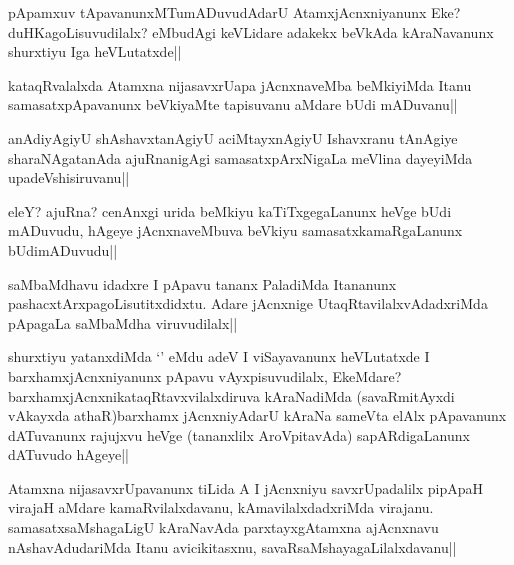 
\begin{artha}
pApamxuv tApavanunxMTumADuvudAdarU AtamxjAcnxniyanunx Eke? duHKagoLisuvudilalx? eMbudAgi keVLidare adakekx beVkAda kAraNavanunx shurxtiyu Iga heVLutatxde||
\end{artha}

\begin{artha}
kataqRvalalxda Atamxna nijasavxrUapa jAcnxnaveMba beMkiyiMda Itanu samasatxpApavanunx beVkiyaMte tapisuvanu aMdare bUdi mADuvanu||
\end{artha}

\begin{artha}
anAdiyAgiyU shAshavxtanAgiyU aciMtayxnAgiyU Ishavxranu tAnAgiye sharaNAgatanAda ajuRnanigAgi samasatxpArxNigaLa meVlina dayeyiMda upadeVshisiruvanu||
\end{artha}


\begin{artha}
eleY? ajuRna? cenAnxgi urida beMkiyu kaTiTxgegaLanunx heVge bUdi mADuvudu, hAgeye jAcnxnaveMbuva beVkiyu samasatxkamaRgaLanunx bUdimADuvudu||
\end{artha}


\begin{artha}
saMbaMdhavu idadxre I pApavu tananx PaladiMda Itananunx pashacxtArxpagoLisutitxdidxtu. Adare jAcnxnige UtaqRtavilalxvAdadxriMda pApagaLa saMbaMdha viruvudilalx||
\end{artha}


\begin{artha}
shurxtiyu yatanxdiMda `\stext' eMdu adeV I viSayavanunx heVLutatxde I barxhamxjAcnxniyanunx pApavu vAyxpisuvudilalx, EkeMdare? barxhamxjAcnxnikataqRtavxvilalxdiruva kAraNadiMda (savaRmitAyxdi vAkayxda athaR)barxhamx jAcnxniyAdarU kAraNa sameVta elAlx pApavanunx dATuvanunx rajujxvu heVge (tananxlilx AroVpitavAda) sapARdigaLanunx dATuvudo hAgeye||
\end{artha}

\begin{artha}
Atamxna nijasavxrUpavanunx tiLida A I jAcnxniyu savxrUpadalilx pipApaH virajaH aMdare kamaRvilalxdavanu, kAmavilalxdadxriMda virajanu. samasatxsaMshagaLigU kAraNavAda parxtayxgAtamxna ajAcnxnavu nAshavAdudariMda Itanu avicikitasxnu, savaRsaMshayagaLilalxdavanu||
\end{artha}

